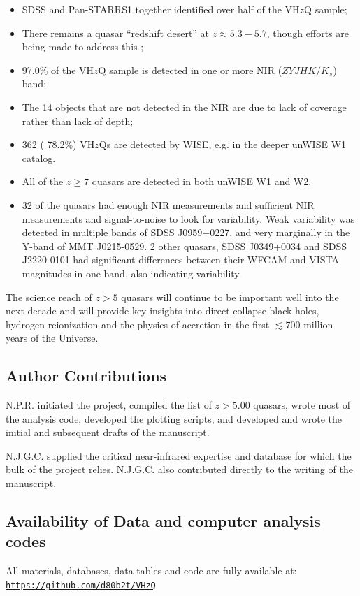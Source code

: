 \documentclass[usenatbib]{mnras}
\begin{document}
\begin{itemize}
    \item SDSS and Pan-STARRS1 together identified over half of the VH$z$Q sample;  
    \item There remains a quasar ``redshift desert'' at $z\approx5.3-5.7$, though 
      efforts are being made to address this \citep[e.g.,][]{YangJ2018a};
    \item 97.0\% of the VH$z$Q sample is detected in one or more NIR ($ZYJHK/K_{s}$) band; 
    \item The 14 objects that are not detected in the NIR are due to lack of coverage rather than lack of depth; 
   \item 362 ( 78.2\%) VH$z$Qs are detected by WISE, e.g. in the deeper unWISE W1 catalog. 
 \item All of the $z\geq7$ quasars are detected in both unWISE W1 and W2. 
 \item 32 of the quasars had enough NIR measurements and sufficient NIR measurements and signal-to-noise to look for variability. Weak variability was detected in multiple bands of SDSS J0959+0227, and very marginally in the Y-band of MMT J0215-0529. 2 other quasars, SDSS J0349+0034 and SDSS J2220-0101 had significant differences between their WFCAM and VISTA magnitudes in one band, also indicating variability. 
\end{itemize}

The science reach of $z>5$ quasars will continue to be important well
into the next decade \citep{Becker2019_DecadalWP, Fan2019_DecadalWP,
Wang2019_DecadalWP} and will provide key insights into direct collapse
black holes, hydrogen reionization and the physics of accretion in the
first $\lesssim$700 million years of the Universe.



\subsection*{Author Contributions}   
N.P.R. initiated the project, compiled the list of $z>5.00$ quasars, wrote most of the analysis code, developed the plotting scripts, and developed and wrote the initial and subsequent drafts of the manuscript.

N.J.G.C. supplied the critical near-infrared expertise and database for which the bulk of the project relies. N.J.G.C. also contributed directly to the writing of the manuscript.



\subsection*{Availability of Data and computer analysis codes} 
All materials, databases, data tables and code are fully available at: 
\href{https://github.com/d80b2t/VHzQ}{\tt https://github.com/d80b2t/VHzQ}
\end{document}
